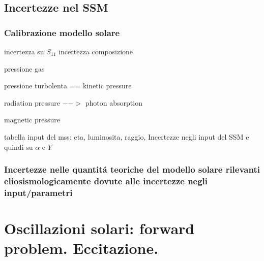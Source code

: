 \begin{refsection}

\section{Incertezze nel SSM}

\begingroup
\nocite{*}
\let\clearpage\relax

\printbibliography[filter=ssmunphys,keyword={rev},heading=bibintoc,title={\textcolor{ochre}{Biblio about: ''Incertezze nei parametri e nella fisica usata nel SSM''}}]
\printbibliography[filter=ssmunphys,notkeyword={rev},heading=bibintoc,title={\textcolor{ochre}{Other refs about: ''Incertezze nei parametri e nella fisica usata nel SSM''}}]
\endgroup

\subsection{Calibrazione modello solare}

incertezza su $S_{11}$
incertezza composizione
\begin{itemize*}
\item pressione gas
\item pressione turbolenta == kinetic pressure
\item radiation pressure $-->$ photon absorption
\item magnetic pressure
\end{itemize*}
tabella input del mss: eta, luminosita, raggio,
Incertezze negli input del SSM e quindi su $\alpha$ e $Y$

\subsection{Incertezze nelle quantit\'a teoriche del modello solare rilevanti eliosismologicamente dovute alle incertezze negli input/parametri}


\end{refsection}


{\let\clearpage\relax
\chapter{Oscillazioni solari: forward problem. Eccitazione.}}
\PartialToc

